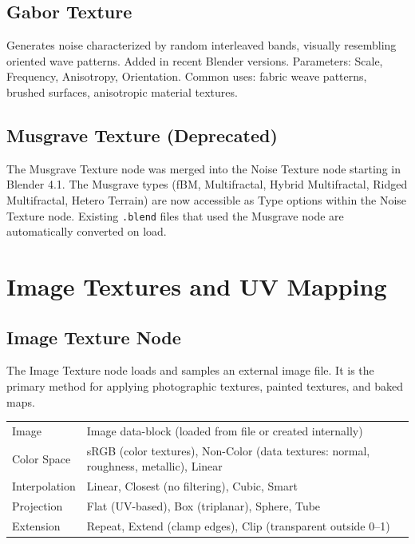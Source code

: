 \subsection{Gabor Texture}

Generates noise characterized by random interleaved bands, visually
resembling oriented wave patterns. Added in recent Blender versions.
Parameters: Scale, Frequency, Anisotropy, Orientation. Common uses:
fabric weave patterns, brushed surfaces, anisotropic material
textures.

\subsection{Musgrave Texture (Deprecated)}

The Musgrave Texture node was merged into the Noise Texture node
starting in Blender 4.1. The Musgrave types (fBM, Multifractal,
Hybrid Multifractal, Ridged Multifractal, Hetero Terrain) are now
accessible as Type options within the Noise Texture node. Existing
\texttt{.blend} files that used the Musgrave node are automatically
converted on load.


\section{Image Textures and UV Mapping}
\label{sec:shading:images}

\subsection{Image Texture Node}

The Image Texture node loads and samples an external image file. It
is the primary method for applying photographic textures, painted
textures, and baked maps.

\begin{center}
\begin{tabularx}{\textwidth}{L{3cm}X}
\toprule
{}
 &  \\
\midrule
Image & Image data-block (loaded from file or created internally) \\
Color Space & sRGB (color textures), Non-Color (data textures: normal, roughness, metallic), Linear \\
Interpolation & Linear, Closest (no filtering), Cubic, Smart \\
Projection & Flat (UV-based), Box (triplanar), Sphere, Tube \\
Extension & Repeat, Extend (clamp edges), Clip (transparent outside 0--1) \\
\bottomrule
\end{tabularx}
\end{center}

